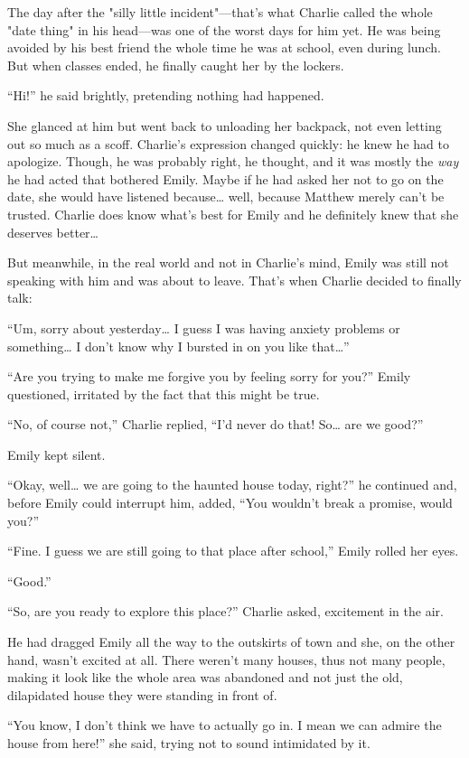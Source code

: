 The day after the "silly little incident"—that's what Charlie called the whole "date thing" in his head—was one of the worst days for him yet. He was being avoided by his best friend the whole time he was at school, even during lunch. But when classes ended, he finally caught her by the lockers.

“Hi!” he said brightly, pretending nothing had happened.

She glanced at him but went back to unloading her backpack, not even letting out so much as a scoff. Charlie's expression changed quickly: he knew he had to apologize. Though, he was probably right, he thought, and it was mostly the \textit{way} he had acted that bothered Emily. Maybe if he had asked her not to go on the date, she would have listened because… well, because Matthew merely can't be trusted. Charlie does know what's best for Emily and he definitely knew that she deserves better…

But meanwhile, in the real world and not in Charlie's mind, Emily was still not speaking with him and was about to leave. That's when Charlie decided to finally talk:

“Um, sorry about yesterday… I guess I was having anxiety problems or something… I don't know why I bursted in on you like that…”

“Are you trying to make me forgive you by feeling sorry for you?” Emily questioned, irritated by the fact that this might be true.

“No, of course not,” Charlie replied, “I'd never do that! So… are we good?”

Emily kept silent.

“Okay, well… we are going to the haunted house today, right?” he continued and, before Emily could interrupt him, added, “You wouldn't break a promise, would you?”

“Fine. I guess we are still going to that place after school,” Emily rolled her eyes.

“Good.”

\bigskip

“So, are you ready to explore this place?” Charlie asked, excitement in the air.

He had dragged Emily all the way to the outskirts of town and she, on the other hand, wasn't excited at all. There weren't many houses, thus not many people, making it look like the whole area was abandoned and not just the old, dilapidated house they were standing in front of.

“You know, I don't think we have to actually go in. I mean we can admire the house from here!” she said, trying not to sound intimidated by it.

